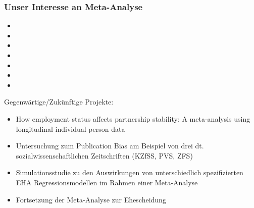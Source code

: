 \documentclass[%
handout%
]{beamer}\usepackage{graphicx, color}
\begin{document}
\begin{frame}[allowframebreaks]
  \frametitle{Unser Interesse an Meta-Analyse}

  \begin{footnotesize}
    \begin{itemize}
    \item {}
    \item {}
    \item {}
    \item {}
    \item {}
    \item {}
    \item {}
    \end{itemize}

    \pagebreak

    Gegenwärtige/Zukünftige Projekte:
    \begin{itemize}
    \item How employment status affects partnership stability: A meta-analysis
      using longitudinal individual person data
    \item Untersuchung zum Publication Bias am Beispiel von drei
      dt. sozialwissenschaftlichen Zeitschriften (KZfSS, PVS, ZFS)
    \item Simulationsstudie zu den Auswirkungen von unterschiedlich
      spezifizierten EHA Regressionsmodellen im Rahmen einer Meta-Analyse
    \item Fortsetzung der Meta-Analyse zur Ehescheidung
    \end{itemize}
  \end{footnotesize}

\end{frame}

















\end{document}
